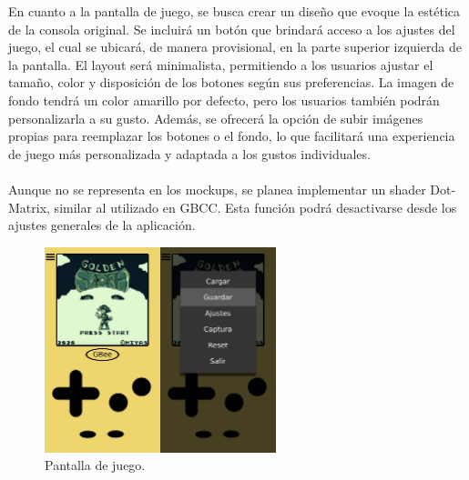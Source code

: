 En cuanto a la pantalla de juego, se busca crear un diseño que evoque la estética de la consola original. Se incluirá un botón que brindará acceso a los ajustes del juego, el cual se ubicará, de manera provisional, en la parte superior izquierda de la pantalla. El layout será minimalista, permitiendo a los usuarios ajustar el tamaño, color y disposición de los botones según sus preferencias. La imagen de fondo tendrá un color amarillo por defecto, pero los usuarios también podrán personalizarla a su gusto. Además, se ofrecerá la opción de subir imágenes propias para reemplazar los botones o el fondo, lo que facilitará una experiencia de juego más personalizada y adaptada a los gustos individuales.
\\\\
Aunque no se representa en los mockups, se planea implementar un shader Dot-Matrix, similar al utilizado en GBCC. Esta función podrá desactivarse desde los ajustes generales de la aplicación.

\begin{figure}[h]
    \centering
    \includegraphics[width=0.6\textwidth]{include/images/mockgame.jpg}
    \caption{Pantalla de juego.}
    \label{figure:mockupgame}
\end{figure}

\cleardoublepage